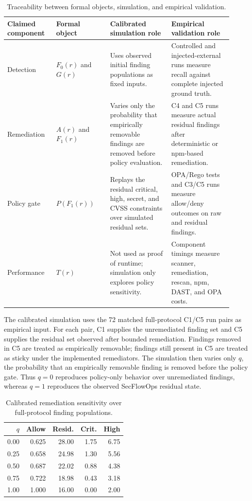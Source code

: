 \begin{table}[t]
\centering
\footnotesize
\caption{Traceability between formal objects, simulation, and empirical validation.}
\label{tab:model-traceability}
\begin{tabular}{@{}p{0.20\linewidth}p{0.22\linewidth}p{0.25\linewidth}p{0.25\linewidth}@{}}
\toprule
Claimed component & Formal object & Calibrated simulation role & Empirical validation role \\
\midrule
Detection & $F_0(r)$ and $G(r)$ & Uses observed initial finding populations as fixed inputs. & Controlled and injected-external runs measure recall against complete injected ground truth. \\
Remediation & $A(r)$ and $F_1(r)$ & Varies only the probability that empirically removable findings are removed before policy evaluation. & C4 and C5 runs measure actual residual findings after deterministic or npm-based remediation. \\
Policy gate & $P(F_1(r))$ & Replays the residual critical, high, secret, and CVSS constraints over simulated residual sets. & OPA/Rego tests and C3/C5 runs measure allow/deny outcomes on raw and residual findings. \\
Performance & $T(r)$ & Not used as proof of runtime; simulation only explores policy sensitivity. & Component timings measure scanner, remediation, rescan, npm, DAST, and OPA costs. \\
\bottomrule
\end{tabular}
\end{table}

The calibrated simulation uses the 72 matched full-protocol C1/C5 run pairs as empirical input. For each pair, C1 supplies the unremediated finding set and C5 supplies the residual set observed after bounded remediation. Findings removed in C5 are treated as empirically removable; findings still present in C5 are treated as sticky under the implemented remediators. The simulation then varies only $q$, the probability that an empirically removable finding is removed before the policy gate. Thus $q=0$ reproduces policy-only behavior over unremediated findings, whereas $q=1$ reproduces the observed SecFlowOps residual state.

\begin{table}[t]
\centering
\caption{Calibrated remediation sensitivity over full-protocol finding populations.}
\label{tab:calibrated-simulation}
\begin{tabular}{rrrrr}
\toprule
$q$ & Allow & Resid. & Crit. & High \\
\midrule
0.00 & 0.625 & 28.00 & 1.75 & 6.75 \\
0.25 & 0.658 & 24.98 & 1.30 & 5.56 \\
0.50 & 0.687 & 22.02 & 0.88 & 4.38 \\
0.75 & 0.722 & 18.98 & 0.43 & 3.18 \\
1.00 & 1.000 & 16.00 & 0.00 & 2.00 \\
\bottomrule
\end{tabular}
\end{table}

